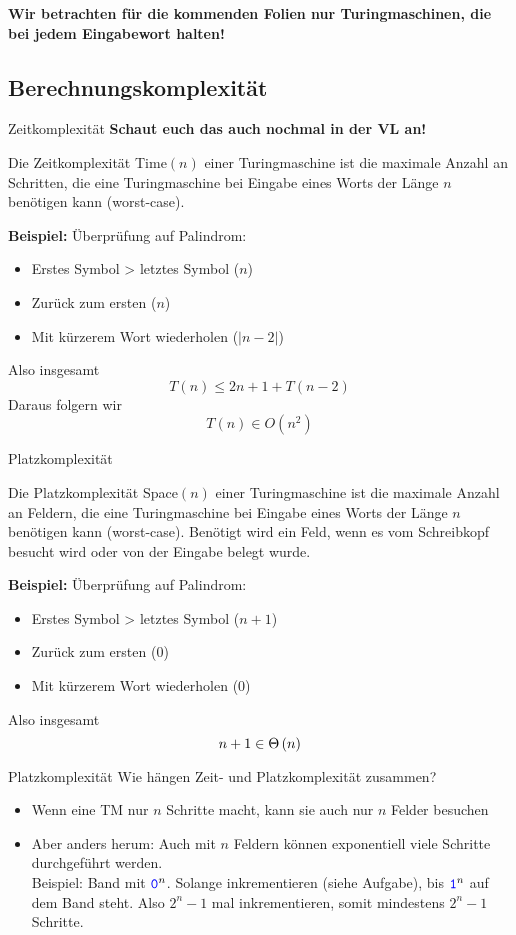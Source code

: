 \begin{frame}[plain] \large \bf \centering
	Wir betrachten für die kommenden Folien nur Turingmaschinen, die bei jedem Eingabewort halten!
\end{frame}

\subsection{Berechnungskomplexität}
\begin{frame}{Zeitkomplexität}
	\textbf{Schaut euch das auch nochmal in der VL an!}
	\begin{Definition}
		Die Zeitkomplexität Time$(n)$ einer Turingmaschine ist die maximale Anzahl an Schritten, die eine Turingmaschine bei Eingabe eines Worts der Länge $n$ benötigen kann (worst-case).
	\end{Definition}
	\pause
	\textbf{Beispiel:} Überprüfung auf Palindrom:
	\begin{itemize}[<+->]
		\item Erstes Symbol \?> letztes Symbol ($n$) 
		\item Zurück zum ersten ($n$)
		\item Mit kürzerem Wort wiederholen ($|n-2|$)
	\end{itemize} \pause
	Also insgesamt $$T(n) \leq 2n + 1 + T(n-2)$$ 
	Daraus folgern wir $$T(n) \in O(n^2)$$
\end{frame}

\begin{frame}{Platzkomplexität}
	\begin{Definition}
		Die Platzkomplexität Space$(n)$ einer Turingmaschine ist die maximale Anzahl an Feldern, die eine Turingmaschine bei Eingabe eines Worts der Länge $n$ benötigen kann (worst-case). Benötigt wird ein Feld, wenn es vom Schreibkopf besucht wird oder von der Eingabe belegt wurde.
	\end{Definition}
	\pause
	\textbf{Beispiel:} Überprüfung auf Palindrom:
	\begin{itemize}[<+->]
		\item Erstes Symbol \?> letztes Symbol ($n + 1$) 
		\item Zurück zum ersten ($0$)
		\item Mit kürzerem Wort wiederholen ($0$)
	\end{itemize} \pause
	Also insgesamt $$n+1 \in \Theta\left(n\right)$$
\end{frame}

\begin{frame}{Platzkomplexität}
	Wie hängen Zeit- und Platzkomplexität zusammen?
	\begin{itemize}
		\item Wenn eine TM nur $n$ Schritte macht, kann sie auch nur $n$ Felder besuchen
		\item Aber anders herum: Auch mit $n$ Feldern können exponentiell viele Schritte durchgeführt werden.\\
			  Beispiel: Band mit $\hbox{\textcolor{blue}{\texttt{0}}}^n$. Solange inkrementieren (siehe Aufgabe), bis $\hbox{\textcolor{blue}{\texttt{1}}}^n$ auf dem Band steht. \pause Also $2^n - 1$ mal inkrementieren, somit mindestens $2^n - 1$ Schritte.
	\end{itemize}
\end{frame}

